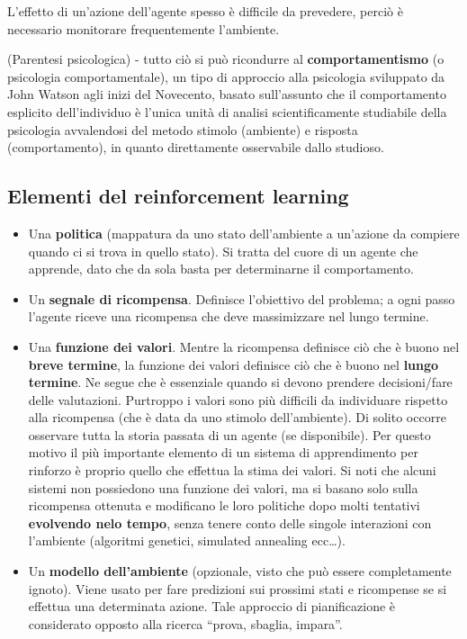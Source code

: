 L'effetto di un'azione dell'agente spesso è difficile da prevedere, perciò è necessario
monitorare frequentemente l'ambiente.

(Parentesi psicologica) - tutto ciò si può ricondurre al \textbf{comportamentismo}
(o psicologia comportamentale), un tipo di approccio alla psicologia sviluppato da
John Watson agli inizi del Novecento, basato sull'assunto che il comportamento
esplicito dell'individuo è l'unica unità di analisi scientificamente studiabile della
psicologia avvalendosi del metodo stimolo (ambiente) e risposta (comportamento), in
quanto direttamente osservabile dallo studioso.

\subsection{Elementi del reinforcement learning}

\begin{itemize}
 \item Una \textbf{politica} (mappatura da uno stato dell'ambiente a un'azione da compiere
quando ci si trova in quello stato). Si tratta del cuore di un agente che apprende,
dato che da sola basta per determinarne il comportamento.
 \item Un \textbf{segnale di ricompensa}. Definisce l'obiettivo del problema; a ogni passo
l'agente riceve una ricompensa che deve massimizzare nel lungo termine.
 \item Una \textbf{funzione dei valori}. Mentre la ricompensa definisce ciò che è buono
nel \textbf{breve termine}, la funzione dei valori definisce ciò che è buono nel
\textbf{lungo termine}.
Ne segue che è essenziale quando si devono prendere decisioni/fare delle valutazioni.
Purtroppo i valori sono più difficili da individuare rispetto alla
ricompensa (che è data da uno stimolo dell'ambiente). Di solito occorre osservare tutta
la storia passata di un agente (se disponibile).
Per questo motivo il più importante elemento di un sistema di apprendimento per rinforzo
è proprio quello che effettua la stima dei valori.
Si noti che alcuni sistemi non possiedono una funzione dei valori, ma si basano solo
sulla ricompensa ottenuta e modificano le loro politiche dopo molti tentativi
\textbf{evolvendo nelo tempo}, senza tenere conto delle singole interazioni con l'ambiente
(algoritmi genetici, simulated annealing ecc\dots).
 \item Un \textbf{modello dell'ambiente} (opzionale, visto che può essere completamente
ignoto). Viene usato per fare predizioni sui prossimi stati e ricompense se si effettua una
determinata azione. Tale approccio di pianificazione è considerato opposto alla ricerca
``prova, sbaglia, impara''.
\end{itemize}

